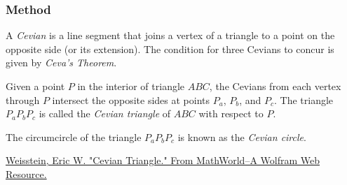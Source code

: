 \vspace{1em}

\begin{tkzexample}[latex=.5\textwidth]
\end{tkzexample}

\subsubsection{Method }
\label{ssub:method_triangle_cevian}

A \emph{Cevian} is a line segment that joins a vertex of a triangle to a point on the opposite side (or its extension). The condition for three Cevians to concur is given by \emph{Ceva's Theorem}.

Given a point $P$ in the interior of triangle $ABC$, the Cevians from each vertex through $P$ intersect the opposite sides at points $P_a$, $P_b$, and $P_c$. The triangle $P_aP_bP_c$ is called the \emph{Cevian triangle} of $ABC$ with respect to $P$.

The circumcircle of the triangle $P_aP_bP_c$ is known as the \emph{Cevian circle}.
\begin{flushright}
  \small
\href{https://mathworld.wolfram.com/CevianTriangle.html}{Weisstein, Eric W. "Cevian Triangle." From MathWorld--A Wolfram Web Resource.}
\end{flushright}

\vspace{1em}

